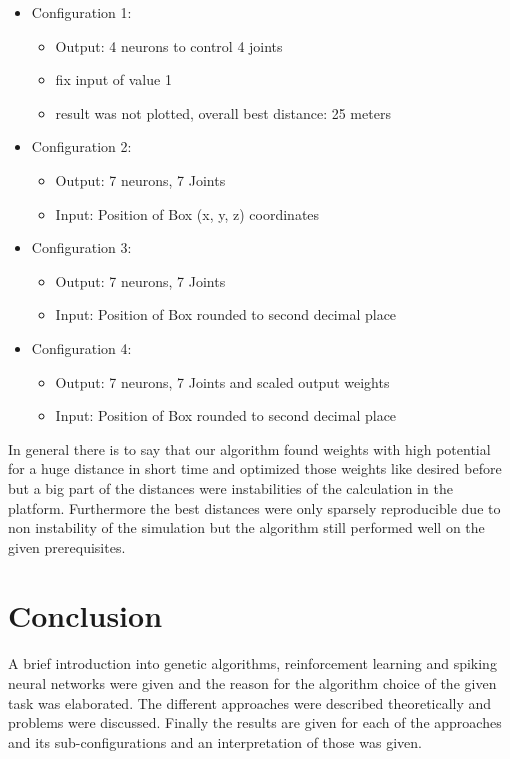 \begin{itemize}
\item Configuration 1: 
\begin{itemize}
\item Output: 4 neurons to control 4 joints
\item fix input of value 1
\item result was not plotted, overall best distance: 25 meters
\end{itemize}
\item Configuration 2: 
\begin{itemize}
\item Output: 7 neurons, 7 Joints 
\item Input: Position of Box (x, y, z) coordinates
\end{itemize}
\item Configuration 3: 
\begin{itemize}
\item Output: 7 neurons, 7 Joints 
\item Input: Position of Box rounded to second decimal place
\end{itemize}
\item Configuration 4: 
\begin{itemize}
\item Output: 7 neurons, 7 Joints and scaled output weights 
\item Input: Position of Box rounded to second decimal place
\end{itemize}
\end{itemize}


In general there is to say that our algorithm found weights with high potential for a huge distance in short time and optimized those weights like desired before but a big part of the distances were instabilities of the calculation in the platform. Furthermore the best distances were only sparsely reproducible due to non instability of the simulation but the algorithm still performed well on the given prerequisites. 

\section{Conclusion}

A brief introduction into genetic algorithms, reinforcement learning and spiking neural networks were given and the reason for the algorithm choice of the given task was elaborated. The different approaches were described theoretically and problems were discussed. Finally the results are given for each of the approaches and its sub-configurations and an interpretation of those was given. 